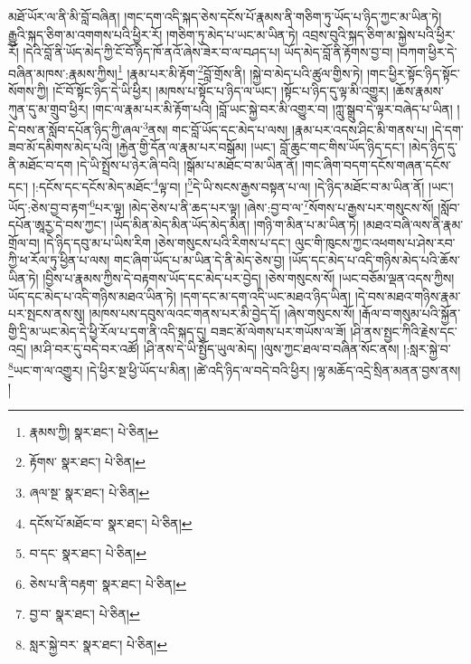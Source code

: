 མཐོ་ཡོར་ལ་ནི་མི་བློ་བཞིན། །གང་དག་འདི་སྐད་ཅེས་དངོས་པོ་རྣམས་ནི་གཅིག་ཏུ་ཡོད་པ་ཉིད་ཀྱང་མ་ཡིན་ཏེ། རྒྱུའི་སྐད་ཅིག་མ་འགགས་པའི་ཕྱིར་རོ། །གཅིག་ཏུ་མེད་པ་ཡང་མ་ཡིན་ཏེ། འབྲས་བུའི་སྐད་ཅིག་མ་སྐྱེས་པའི་ཕྱིར་རོ། །དེའི་བློ་ནི་ཡོད་མེད་ཀྱི་ངོ་བོ་ཉིད་ཁོ་ནའོ་ཞེས་ཟེར་བ་ལ་བཤད་པ། ཡོད་མེད་བློ་ནི་རྟོགས་བྱ་བ། །བཀག་ཕྱིར་དེ་བཞིན་མཁས་:རྣམས་ཀྱིས།\footnote{རྣམས་ཀྱི།  སྣར་ཐང་།  པེ་ཅིན། } །རྣམ་པར་མི་རྟོག་\footnote{རྟོགས་  སྣར་ཐང་།  པེ་ཅིན། }བློ་གྲོས་ནི། །སྐྱེ་བ་མེད་པའི་ཚུལ་གྱིས་ཏེ། །གང་ཕྱིར་སྟོང་ཉིད་སྟོང་སོགས་ཀྱི། །ངོ་བོ་སྟོང་ཉིད་དེ་ཡི་ཕྱིར། །མཁས་པ་སྟོང་པ་ཉིད་ལ་ཡང་། །སྟོང་པ་ཉིད་དུ་ལྟ་མི་འགྱུར། །ཆོས་རྣམས་ཀུན་དུ་མ་གྲུབ་ཕྱིར། །གང་ལ་རྣམ་པར་མི་རྟོག་པའི། །བློ་ཡང་སྐྱེ་བར་མི་འགྱུར་བ། །ཀླུ་སྒྲུབ་དེ་ལྟར་བཞེད་པ་ཡིན། །དེ་བས་ན་སློབ་དཔོན་ཉིད་ཀྱི་ཞལ་\footnote{ཞལ་སྔ་  སྣར་ཐང་།  པེ་ཅིན། }ནས། གང་བློ་ཡོད་དང་མེད་པ་ལས། །རྣམ་པར་འདས་ཤིང་མི་གནས་པ། །དེ་དག་ཟབ་མོ་དམིགས་མེད་པའི། །རྐྱེན་གྱི་དོན་ལ་རྣམ་པར་བསྒོམ། །ཡང་། བློ་ཆུང་གང་གིས་ཡོད་ཉིད་དང་། །མེད་ཉིད་དུ་ནི་མཐོང་བ་དག །དེ་ཡི་སྤྲོས་པ་ཉེར་ཞི་བའི། །སྒོམ་པ་མཐོང་བ་མ་ཡིན་ནོ། །གང་ཞིག་བདག་དངོས་གཞན་དངོས་དང་། །:དངོས་དང་དངོས་མེད་མཐོང་\footnote{དངོས་པོ་མཐོང་བ་  སྣར་ཐང་།  པེ་ཅིན། }ལྟ་བ། །\footnote{བ་དང་  སྣར་ཐང་།  པེ་ཅིན། }དེ་ཡི་སངས་རྒྱས་བསྟན་པ་ལ། །དེ་ཉིད་མཐོང་བ་མ་ཡིན་ནོ། །ཡང་། ཡོད་:ཅེས་བྱ་བ་རྟག་\footnote{ཅེས་པ་ནི་བརྟག་  སྣར་ཐང་།  པེ་ཅིན། }པར་ལྟ། །མེད་ཅེས་པ་ནི་ཆད་པར་ལྟ། །ཞེས་:བྱ་བ་ལ་\footnote{བྱ་བ་  སྣར་ཐང་།  པེ་ཅིན། }སོགས་པ་རྒྱས་པར་གསུངས་སོ། །སློབ་དཔོན་ཨཱརྱ་དེ་བས་ཀྱང་། །ཡོད་མིན་མེད་མིན་ཡོད་མེད་མིན། །གཉི་ག་མིན་པ་མ་ཡིན་ཏེ། །མཐའ་བཞི་ལས་ནི་རྣམ་གྲོལ་བ། །དེ་ཉིད་དབུ་མ་པ་ཡིས་རིག །ཅེས་གསུངས་པའི་རིགས་པ་དང་། ལུང་གི་ཁུངས་ཀྱང་འཕགས་པ་ཤེས་རབ་ཀྱི་ཕ་རོལ་ཏུ་ཕྱིན་པ་ལས། གང་ཞིག་ཡོད་པ་མ་ཡིན་དེ་ནི་མེད་ཅེས་བྱ། །ཡོད་དང་མེད་པ་འདི་གཉིས་མེད་པའི་ཆོས་ཡིན་ཏེ། །བྱིས་པ་རྣམས་ཀྱིས་དེ་བརྟགས་ཡོད་དང་མེད་པར་བྱེད། །ཅེས་གསུངས་སོ། །ཡང་བཅོམ་ལྡན་འདས་ཀྱིས། ཡོད་དང་མེད་པ་འདི་གཉིས་མཐའ་ཡིན་ཏེ། །དག་དང་མ་དག་འདི་ཡང་མཐའ་ཉིད་ཡིན། །དེ་བས་མཐའ་གཉིས་རྣམ་པར་སྤངས་ནས་སུ། །མཁས་པས་དབུས་ལའང་གནས་པར་མི་བྱེད་དོ། །ཞེས་གསུངས་སོ། །རྒོལ་བ་གསུམ་པའི་སྐྱོན་གྱི་དྲི་མ་ཡང་མེད་དེ་ཕྱི་རོལ་པ་དག་ནི་འདི་སྐད་དུ། བཟང་མོ་ལེགས་པར་གཡོས་ལ་ཟོ། །ཤི་ནས་སྤྱང་ཀིའི་རྗེས་དང་འདྲ། །མ་ཤི་བར་དུ་བདེ་བར་འཚོ། །ཤི་ནས་དེ་ཡི་སྤྱོད་ཡུལ་མེད། །ལུས་ཀྱང་ཐལ་བ་བཞིན་སོང་ནས། །:སླར་སྐྱེ་བ་\footnote{སླར་སྐྱེ་བར་  སྣར་ཐང་།  པེ་ཅིན། }ཡང་ག་ལ་འགྱུར། །དེ་ཕྱིར་སྔ་ཕྱི་ཡོད་པ་མིན། །ཚེ་འདི་ཉིད་ལ་བདེ་བའི་ཕྱིར། །ལྷ་མཆོད་འདྲེ་སྲིན་མནན་བྱས་ནས། །
